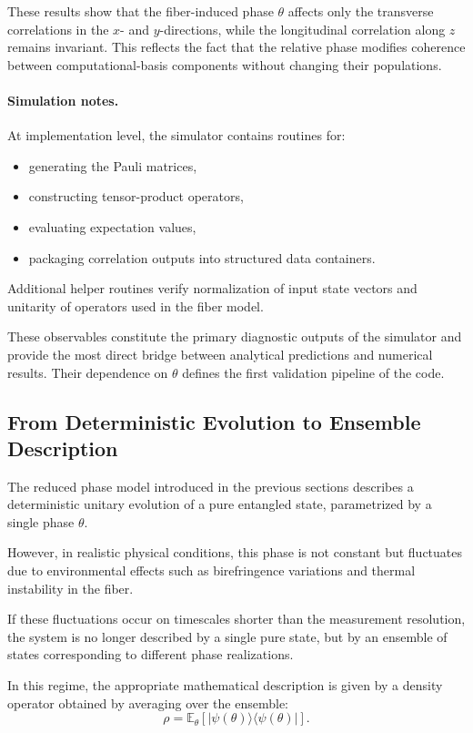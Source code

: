 \documentclass[a4paper]{article}
\begin{document}
These results show that the fiber-induced phase \(\theta\) affects only the transverse correlations in the \(x\)- and \(y\)-directions, while the longitudinal correlation along \(z\) remains invariant. This reflects the fact that the relative phase modifies coherence between computational-basis components without changing their populations.

\paragraph{Simulation notes.}
At implementation level, the simulator contains routines for:
\begin{itemize}
    \item generating the Pauli matrices,
    \item constructing tensor-product operators,
    \item evaluating expectation values,
    \item packaging correlation outputs into structured data containers.
\end{itemize}

Additional helper routines verify normalization of input state vectors and unitarity of operators used in the fiber model.

These observables constitute the primary diagnostic outputs of the simulator and provide the most direct bridge between analytical predictions and numerical results. Their dependence on \(\theta\) defines the first validation pipeline of the code.

\subsection{From Deterministic Evolution to Ensemble Description}

The reduced phase model introduced in the previous sections describes a deterministic unitary evolution of a pure entangled state, parametrized by a single phase \(\theta\).

However, in realistic physical conditions, this phase is not constant but fluctuates due to environmental effects such as birefringence variations and thermal instability in the fiber.

If these fluctuations occur on timescales shorter than the measurement resolution, the system is no longer described by a single pure state, but by an ensemble of states corresponding to different phase realizations.

In this regime, the appropriate mathematical description is given by a density operator obtained by averaging over the ensemble:
\[
\rho = \mathbb{E}_{\theta}\left[ |\psi(\theta)\rangle\langle \psi(\theta)| \right].
\]
\end{document}
